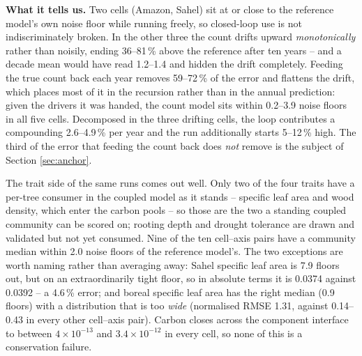 \documentclass[11pt]{article}
\begin{document}
\begin{table}[h]
{\textbf{What it tells us.} Two cells (Amazon, Sahel) sit at or close to the reference model's own noise floor while running freely, so closed-loop use is not indiscriminately broken. In the other three the count drifts upward \emph{monotonically} rather than noisily, ending 36--81\,\% above the reference after ten years -- and a decade mean would have read 1.2--1.4 and hidden the drift completely. Feeding the true count back each year removes 59--72\,\% of the error and flattens the drift, which places most of it in the recursion rather than in the annual prediction: given the drivers it was handed, the count model sits within 0.2--3.9 noise floors in all five cells. Decomposed in the three drifting cells, the loop contributes a compounding 2.6--4.9\,\% per year and the run additionally starts 5--12\,\% high. The third of the error that feeding the count back does \emph{not} remove is the subject of Section \ref{sec:anchor}.}
\label{tab:coupled}
\small
{}
\end{table}

The trait side of the same runs comes out well. Only two of the four traits have a per-tree consumer in the coupled model as it stands -- specific leaf area and wood density, which enter the carbon pools -- so those are the two a standing coupled community can be scored on; rooting depth and drought tolerance are drawn and validated but not yet consumed. Nine of the ten cell--axis pairs have a community median within 2.0 noise floors of the reference model's. The two exceptions are worth naming rather than averaging away: Sahel specific leaf area is 7.9 floors out, but on an extraordinarily tight floor, so in absolute terms it is 0.0374 against 0.0392 -- a 4.6\,\% error; and boreal specific leaf area has the right median (0.9 floors) with a distribution that is too \emph{wide} (normalised RMSE 1.31, against 0.14--0.43 in every other cell--axis pair). Carbon closes across the component interface to between $4 \times 10^{-13}$ and $3.4 \times 10^{-12}$ in every cell, so none of this is a conservation failure.
\end{document}

